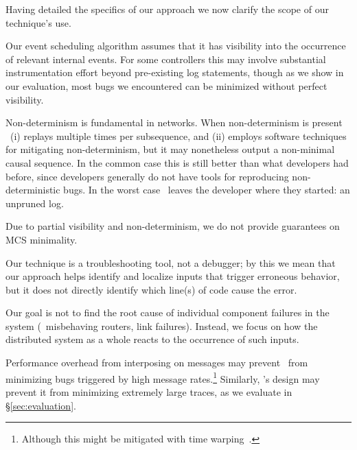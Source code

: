 Having detailed the specifics of our approach we now
clarify the scope of our technique's use.

 Our event scheduling algorithm assumes that
it has visibility into the occurrence of relevant internal events. For
some controllers this may involve substantial instrumentation effort beyond
pre-existing log statements, though as we show in our evaluation, most bugs
we encountered can be minimized without perfect visibility.

 Non-determinism
is fundamental in networks. When non-determinism is present
\projectname~(i) replays multiple times per subsequence, and (ii) employs
software techniques for mitigating non-determinism, but it may nonetheless
output a non-minimal causal sequence. In the common case this is still
better than what developers had before, since developers generally
do not have tools for reproducing non-deterministic bugs.
In the worst case \projectname~leaves the
developer where they started: an unpruned log.

 Due to partial visibility and
non-determinism, we do not provide guarantees on MCS minimality.


 Our technique is a troubleshooting tool, not a debugger;
by this we mean that our approach helps identify and localize inputs that
trigger erroneous behavior, but it does not directly identify which
line(s) of code cause the error.

 Our goal is not to find the root
cause of individual component failures in the system (\eg~misbehaving routers,
link failures). Instead, we focus on
how the distributed system as a whole reacts to the occurrence of such inputs.

 Performance overhead from interposing on
messages may prevent \projectname~from minimizing bugs triggered by
high message rates.\footnote{Although this might be mitigated with
time warping~\cite{Gupta06toinfinity}.} Similarly, \projectname's design may
prevent it from minimizing extremely large traces, as we evaluate in
\S\ref{sec:evaluation}.

